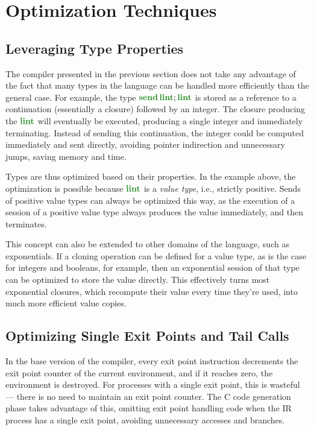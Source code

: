 \documentclass[sigconf,nonacm,natbib=true]{acmart}
\begin{document}
\section{Optimization Techniques} \label{sec:optimizations}

\subsection{Leveraging Type Properties}

The compiler presented in the previous section does not take any advantage of the fact that many types in the language can be handled more efficiently than the general case. For example, the type $\sendt{\lintt}{\lintt}$ is stored as a reference to a continuation (essentially a closure) followed by an integer. The closure producing the $\lintt$ will eventually be executed, producing a single integer and immediately terminating. Instead of sending this continuation, the integer could be computed immediately and sent directly, avoiding pointer indirection and unnecessary jumps, saving memory and time.

Types are thus optimized based on their properties. In the example above, the optimization is possible because $\lintt$ is a \textit{value type}, i.e., strictly positive. Sends of positive value types can always be optimized this way, as the execution of a session of a positive value type always produces the value   immediately, and then terminates.

This concept can also be extended to other domains of the language, such as exponentials. If a cloning operation can be defined for a value type, as is the case for integers and booleans, for example, then an exponential session of that type can be optimized to store the value directly. This effectively turns most exponential closures, which recompute their value every time they're used, into much more efficient value copies. 

\subsection{Optimizing Single Exit Points and Tail Calls}

In the base version of the compiler, every exit point instruction decrements the exit point counter of the current environment, and if it reaches zero, the environment is destroyed. For processes with a single exit point, this is wasteful --- there is no need to maintain an exit point counter. The C code generation phase takes advantage of this, omitting exit point handling code when the \ac{IR} process has a single exit point, avoiding unnecessary accesses and branches.
\end{document}
